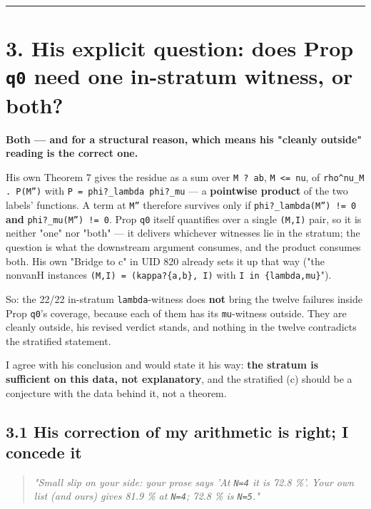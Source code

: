 \documentclass[11pt,a4paper]{article}
\begin{document}
\medskip\hrule\medskip

\section*{3. His explicit question: does Prop \mbox{\texttt{q0}} need one in-stratum witness, or both?}

\textbf{Both --- and for a structural reason, which means his "cleanly outside" reading is the correct one.}

His own Theorem 7 gives the residue as a sum over \mbox{\texttt{M ? ab}}, \mbox{\texttt{M <= nu}}, of \mbox{\texttt{rho\textasciicircum{}nu\_M . P(M'')}} with \mbox{\texttt{P = phi?\_lambda phi?\_mu}} --- a \textbf{pointwise product} of the two labels' functions. A term at \mbox{\texttt{M''}} therefore survives only if \mbox{\texttt{phi?\_lambda(M'') != 0}} \textbf{and} \mbox{\texttt{phi?\_mu(M'') != 0}}. Prop \mbox{\texttt{q0}} itself quantifies over a single \mbox{\texttt{(M,I)}} pair, so it is neither "one" nor "both" --- it delivers whichever witnesses lie in the stratum; the question is what the downstream argument consumes, and the product consumes both. His own "Bridge to c" in UID 820 already sets it up that way ("the nonvanH instances \mbox{\texttt{(M,I) = (kappa?\{a,b\}, I)}} with \mbox{\texttt{I in \{lambda,mu\}}}").

So: the 22/22 in-stratum \mbox{\texttt{lambda}}-witness does \textbf{not} bring the twelve failures inside Prop \mbox{\texttt{q0}}'s coverage, because each of them has its \mbox{\texttt{mu}}-witness outside. They are cleanly outside, his revised verdict stands, and nothing in the twelve contradicts the stratified statement.

I agree with his conclusion and would state it his way: \textbf{the stratum is sufficient on this data, not explanatory}, and the stratified (c) should be a conjecture with the data behind it, not a theorem.

\subsection*{3.1 His correction of my arithmetic is right; I concede it}

\begin{quote}\itshape \emph{"Small slip on your side: your prose says 'At \mbox{\texttt{N=4}} it is 72.8 \%'. Your own list (and ours) gives 81.9 \% at \mbox{\texttt{N=4}}; 72.8 \% is \mbox{\texttt{N=5}}."}\end{quote}
\end{document}
